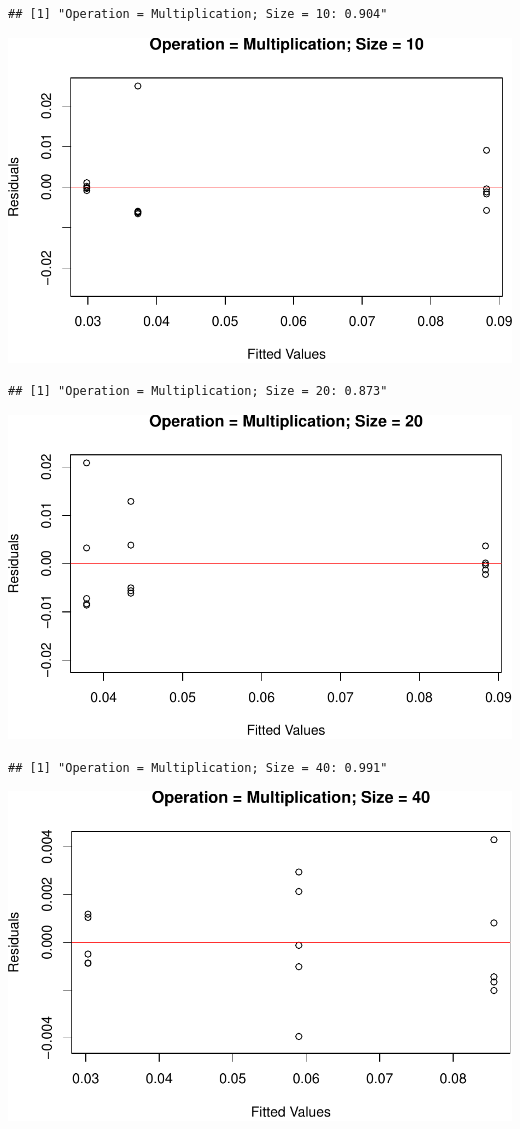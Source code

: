 \documentclass[
]{article}
\begin{document}
\begin{verbatim}
## [1] "Operation = Multiplication; Size = 10: 0.904"
\end{verbatim}

\includegraphics{main_files/figure-latex/unnamed-chunk-20-9.pdf}

\begin{verbatim}
## [1] "Operation = Multiplication; Size = 20: 0.873"
\end{verbatim}

\includegraphics{main_files/figure-latex/unnamed-chunk-20-10.pdf}

\begin{verbatim}
## [1] "Operation = Multiplication; Size = 40: 0.991"
\end{verbatim}

\includegraphics{main_files/figure-latex/unnamed-chunk-20-11.pdf}
\end{document}

